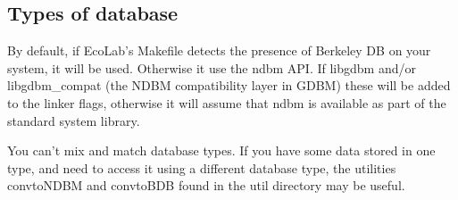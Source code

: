 \subsection{Types of database}

By default, if EcoLab's Makefile detects the presence of Berkeley DB on
your system, it will be used. Otherwise it use the ndbm API. If
libgdbm and/or libgdbm\_compat (the NDBM compatibility layer in GDBM)
these will be added to the linker flags, otherwise it will assume that
ndbm is available as part of the standard system library.

You can't mix and match database types. If you have some data stored
in one type, and need to access it using a different database type,
the utilities convtoNDBM and convtoBDB found in the util directory may
be useful.
